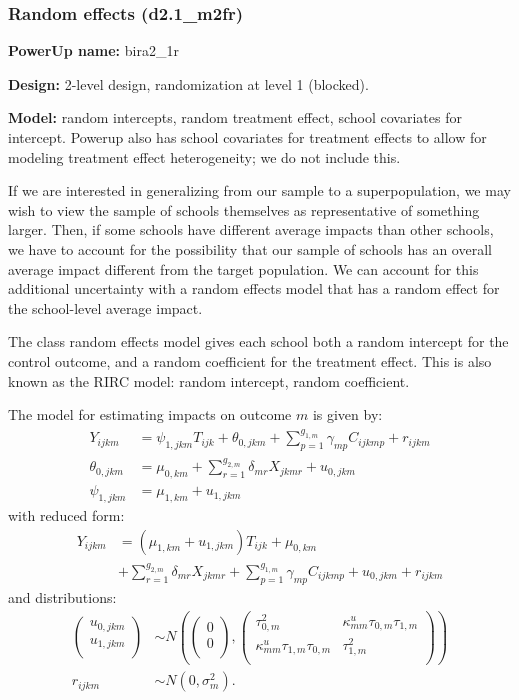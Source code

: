 \documentclass[12pt]{article}
\begin{document}
\subsubsection{Random effects (d2.1\_m2fr)}

\textbf{PowerUp name:} bira2\_1r

\textbf{Design:} 2-level design, randomization at level 1 (blocked).

\textbf{Model:} random intercepts, random treatment effect, school covariates for intercept. Powerup also has school covariates for treatment effects to allow for modeling treatment effect heterogeneity; we do not include this.

If we are interested in generalizing from our sample to a superpopulation, we may wish to view the sample of schools themselves as representative of something larger.
Then, if some schools have different average impacts than other schools, we have to account for the possibility that our sample of schools has an overall average impact different from the target population.
We can account for this additional uncertainty with a random effects model that has a random effect for the school-level average impact.

The class random effects model gives each school both a random intercept for the control outcome, and  a random coefficient for the treatment effect.
This is also known as the RIRC model: random intercept, random coefficient.

The model for estimating impacts on outcome $m$ is given by:
\begin{align}
Y_{ijkm} &= \psi_{1,jkm} T_{ijk} + \theta_{0,jkm} + \sum_{p=1}^{g_{1,m}} \gamma_{mp} C_{ijkmp} + r_{ijkm}\\
\nonumber \theta_{0,jkm} &= \mu_{0,km} + \sum_{r=1}^{g_{2,m}} \delta_{mr} X_{jkmr} + u_{0,jkm}\\
\nonumber \psi_{1,jkm} &= \mu_{1,km} + u_{1,jkm}
\end{align}
with reduced form:
\begin{align}
Y_{ijkm} &= \left(\mu_{1,km} + u_{1,jkm}\right) T_{ijk} + \mu_{0,km} \\
\nonumber & + \sum_{r=1}^{g_{2,m}} \delta_{mr} X_{jkmr} + \sum_{p=1}^{g_{1,m}} \gamma_{mp} C_{ijkmp} + u_{0,jkm} + r_{ijkm}
\end{align}
and distributions:
\begin{align}
\begin{pmatrix} u_{0, jkm} \\ u_{1,jkm}\\ \end{pmatrix} &\sim
N\left(\begin{pmatrix} 0 \\ 0\\ \end{pmatrix}, \begin{pmatrix} \tau^2_{0,m} & \kappa^u_{mm} \tau_{0,m} \tau_{1,m} \\ \kappa^u_{mm} \tau_{1,m} \tau_{0,m} & \tau^2_{1,m} \\ \end{pmatrix}\right) \\
\nonumber r_{ijkm} &\sim N\left(0, \sigma^2_m\right).
\end{align}
\end{document}

